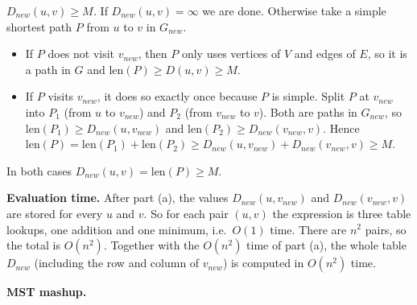\documentclass[11pt,addpoints,answers]{exam}
\begin{document}
\begin{questions}
\begin{parts}
\begin{solution}
      \emph{$D_{new}(u,v) \ge M$.}
      If $D_{new}(u,v) = \infty$ we are done.
      Otherwise take a simple shortest path $P$ from $u$ to $v$ in $G_{new}$.
      \begin{itemize}
        \item If $P$ does not visit $v_{new}$, then $P$ only uses vertices of $V$ and edges of $E$, so it is a path in $G$ and $\text{len}(P) \ge D(u,v) \ge M$.
        \item If $P$ visits $v_{new}$, it does so exactly once because $P$ is simple.
        Split $P$ at $v_{new}$ into $P_1$ (from $u$ to $v_{new}$) and $P_2$ (from $v_{new}$ to $v$).
        Both are paths in $G_{new}$, so $\text{len}(P_1) \ge D_{new}(u,v_{new})$ and $\text{len}(P_2) \ge D_{new}(v_{new},v)$.
        Hence $\text{len}(P) = \text{len}(P_1) + \text{len}(P_2) \ge D_{new}(u,v_{new}) + D_{new}(v_{new},v) \ge M$.
      \end{itemize}
      In both cases $D_{new}(u,v) = \text{len}(P) \ge M$.

      \textbf{Evaluation time.}
      After part (a), the values $D_{new}(u,v_{new})$ and $D_{new}(v_{new},v)$ are stored for every $u$ and $v$.
      So for each pair $(u,v)$ the expression is three table lookups, one addition and one minimum, i.e.\ $O(1)$ time.
      There are $n^2$ pairs, so the total is $O(n^2)$.
      Together with the $O(n^2)$ time of part (a), the whole table $D_{new}$ (including the row and column of $v_{new}$) is computed in $O(n^2)$ time.
    \end{solution}
  \end{parts}  



  \question \textbf{MST mashup.} \nopagebreak 
  
\end{questions}
\end{document}
